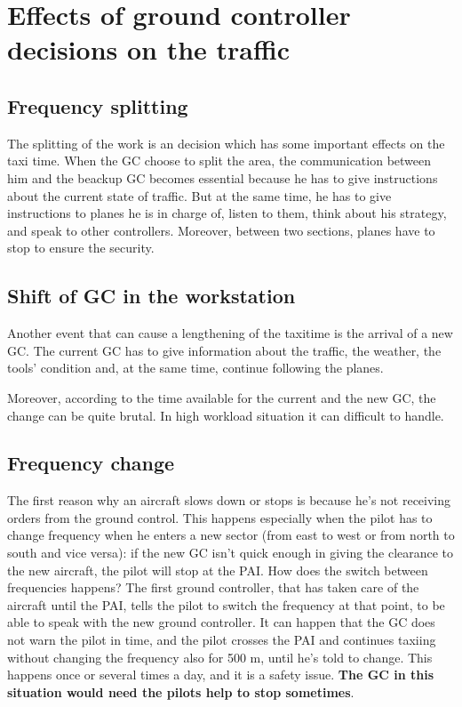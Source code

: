 \documentclass{article}
\begin{document}
\section{Effects of ground controller decisions on the traffic}
\subsection{Frequency splitting}
The splitting of the work is an decision which has some important effects on the taxi time. When the GC choose to split the area, the communication between him and the beackup GC becomes essential because he has to give instructions about the current state of traffic. But at the same time, he has to give instructions to planes he is in charge of, listen to them, think about his strategy, and speak to other controllers. Moreover, between two sections, planes have to stop to ensure the security.
\subsection{Shift of GC in the workstation}
Another event that can cause a lengthening of the taxitime is the arrival of a new GC. The current GC has to give information about the traffic, the weather, the tools' condition and, at the same time, continue following the planes.

Moreover, according to the time available for the current and the new GC, the change can be quite brutal. In high workload situation it can difficult to handle. 

\subsection{Frequency change}
The first reason why an aircraft slows down or stops is because he's not receiving orders from the ground control. This happens especially when the pilot has to change frequency when he enters a new sector (from east to west or from north to south and vice versa): if the new GC isn't quick enough in giving the clearance to the new aircraft, the pilot will stop at the PAI.
How does the switch between frequencies happens? The first ground controller, that has taken care of the aircraft until the PAI, tells the pilot to switch the frequency at that point, to be able to speak with the new ground controller. It can happen that the GC does not warn the pilot in time, and the pilot crosses the PAI and continues taxiing without changing the frequency also for 500 m, until he's told to change. This happens once or several times a day, and it is a safety issue. \textbf{The GC in this situation would need the pilots help to stop sometimes}.
\end{document}
